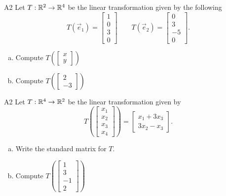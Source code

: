 \begin{problem}{A2}
Let $T: \mathbb{R}^2 \rightarrow \mathbb{R}^4$ be the linear transformation given by the following
$$T(\vec e_1)=\begin{bmatrix} 1 \\ 0 \\ 3 \\ 0\end{bmatrix}\hspace{2em}
T(\vec e_2)=\begin{bmatrix} 0 \\ 3 \\ -5 \\ 0 \end{bmatrix}.$$
\begin{enumerate}[(a)]
\item Compute \( T\left( \begin{bmatrix}x\\ y  \end{bmatrix} \right) \)
\item Compute \( T\left( \begin{bmatrix} 2 \\ -3\end{bmatrix} \right) \)
\end{enumerate}
\end{problem}

\begin{problem}{A2}
Let $T: \mathbb{R}^4 \rightarrow \mathbb{R}^2$ be the linear transformation given by $$T\left(\begin{bmatrix} x_1 \\ x_2 \\ x_3 \\ x_4 \end{bmatrix} \right) = \begin{bmatrix} x_1+3x_3 \\ 3x_2-x_3 \end{bmatrix}.$$
\begin{enumerate}[(a)]
\item Write the standard matrix for $T$.
\item Compute \( T\left( \begin{bmatrix} 1 \\ 3 \\ -1 \\ 2 \end{bmatrix} \right) \)
\end{enumerate}
\end{problem}


